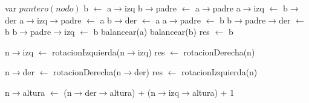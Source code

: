 \begin{algorithm}\phantom{[H]}
\begin{algorithmic}[1]
   \State var $puntero(nodo)$ b $\gets$ a$\rightarrow$izq 
   \State b$\rightarrow$padre $\gets$ a$\rightarrow$padre 
   \State a$\rightarrow$izq $\gets$ b$\rightarrow$der 
    
     \State a$\rightarrow$izq$\rightarrow$padre $\gets$ a 
   \EndIf
   \State b$\rightarrow$der $\gets$ a 
   \State a$\rightarrow$padre $\gets$ b    
    
      
       \State b$\rightarrow$padre$\rightarrow$der $\gets$ b 
     \Else
       \State b$\rightarrow$padre$\rightarrow$izq $\gets$ b 
     \EndIf
  \EndIf
  \State balancear(a) 
  \State balancear(b) 
  \State res $\gets$ b 
\EndFunction
\end{algorithmic}
\end{algorithm}



\begin{algorithm}\phantom{[H]}
\begin{algorithmic}[1]
   \State n$\rightarrow$izq $\gets$ rotacionIzquierda(n$\rightarrow$izq) 
  \State res $\gets$ rotacionDerecha(n) 
\EndFunction
\end{algorithmic}
\end{algorithm}


\begin{algorithm}\phantom{[H]}
\begin{algorithmic}[1]
   \State n$\rightarrow$der $\gets$ rotacionDerecha(n$\rightarrow$der) 
  \State res $\gets$ rotacionIzquierda(n) 
\EndFunction
\end{algorithmic}
\end{algorithm}





\begin{algorithm}\phantom{[H]}
\begin{algorithmic}[1]
   \State n$\rightarrow$altura $\gets$ (n$\rightarrow$der$\rightarrow$altura) + (n$\rightarrow$izq$\rightarrow$altura) + 1 
\EndFunction
\end{algorithmic}
\end{algorithm}




